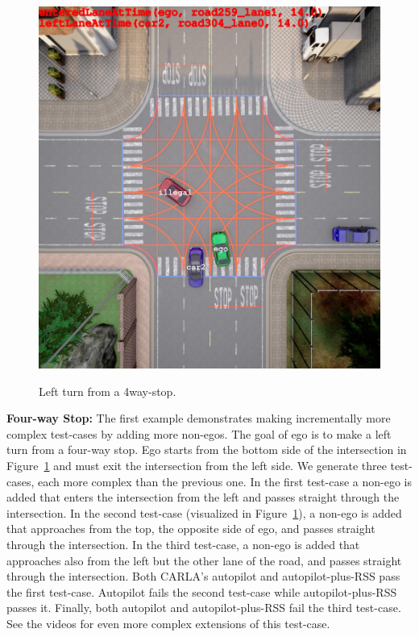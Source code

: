 \begin{figure}[ht]
\begin{minipage}[t]{.499\linewidth}
  \end{minipage}%
  \hfill
  \begin{minipage}[t]{.499\linewidth}
    {\includegraphics[width=\linewidth]{figures/chapter4/2_280.jpg}}%
  \end{minipage}%
  \caption{Left turn from a 4way-stop.}
  \label{fig:4way}%
\end{figure}%

\textbf{Four-way Stop:} The first example demonstrates making incrementally more complex test-cases by adding more non-egos.
%
The goal of ego is to make a left turn from a four-way stop.
%
Ego starts from the bottom side of the intersection in Figure~\ref{fig:4way} and must exit the intersection from the left side.
%
We generate three test-cases, each more complex than the previous one.
%
In the first test-case a non-ego is added that enters the intersection from the left and passes straight through the intersection.
%
In the second test-case (visualized in Figure~\ref{fig:4way}), a non-ego is added that approaches from the top, the opposite side of ego, and passes straight through the intersection.
%
In the third test-case, a non-ego is added that approaches also from the left but the other lane of the road, and passes straight through the intersection.
%
Both CARLA's autopilot and autopilot-plus-RSS pass the first test-case.
%
Autopilot fails the second test-case while autopilot-plus-RSS passes it.
%
Finally, both autopilot and autopilot-plus-RSS fail the third test-case.
%
See the videos for even more complex extensions of this test-case.


